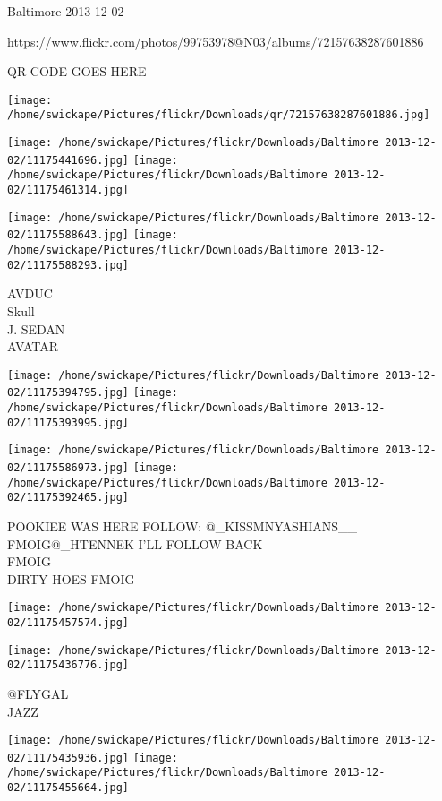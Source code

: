 \documentclass[10pt,letterpaper]{article}
\begin{document}
Baltimore 2013-12-02

https://www.flickr.com/photos/99753978@N03/albums/72157638287601886

QR CODE GOES HERE

\texttt{[image: /home/swickape/Pictures/flickr/Downloads/qr/72157638287601886.jpg]}
\pagebreak

\texttt{[image: /home/swickape/Pictures/flickr/Downloads/Baltimore 2013-12-02/11175441696.jpg]}
\texttt{[image: /home/swickape/Pictures/flickr/Downloads/Baltimore 2013-12-02/11175461314.jpg]}

\texttt{[image: /home/swickape/Pictures/flickr/Downloads/Baltimore 2013-12-02/11175588643.jpg]}
\texttt{[image: /home/swickape/Pictures/flickr/Downloads/Baltimore 2013-12-02/11175588293.jpg]}

AVDUC\\
Skull\\
J. SEDAN\\
AVATAR\\
\pagebreak

\texttt{[image: /home/swickape/Pictures/flickr/Downloads/Baltimore 2013-12-02/11175394795.jpg]}
\texttt{[image: /home/swickape/Pictures/flickr/Downloads/Baltimore 2013-12-02/11175393995.jpg]}

\texttt{[image: /home/swickape/Pictures/flickr/Downloads/Baltimore 2013-12-02/11175586973.jpg]}
\texttt{[image: /home/swickape/Pictures/flickr/Downloads/Baltimore 2013-12-02/11175392465.jpg]}

POOKIEE WAS HERE FOLLOW: @\_KISSMNYASHIANS\_\_\\
FMOIG@\_HTENNEK I'LL FOLLOW BACK\\
FMOIG\\
DIRTY HOES FMOIG\\
\pagebreak

\texttt{[image: /home/swickape/Pictures/flickr/Downloads/Baltimore 2013-12-02/11175457574.jpg]}

\vspace{0.25in}
\texttt{[image: /home/swickape/Pictures/flickr/Downloads/Baltimore 2013-12-02/11175436776.jpg]}

@FLYGAL\\
JAZZ\\
\pagebreak

\texttt{[image: /home/swickape/Pictures/flickr/Downloads/Baltimore 2013-12-02/11175435936.jpg]}
\texttt{[image: /home/swickape/Pictures/flickr/Downloads/Baltimore 2013-12-02/11175455664.jpg]}
\end{document}
